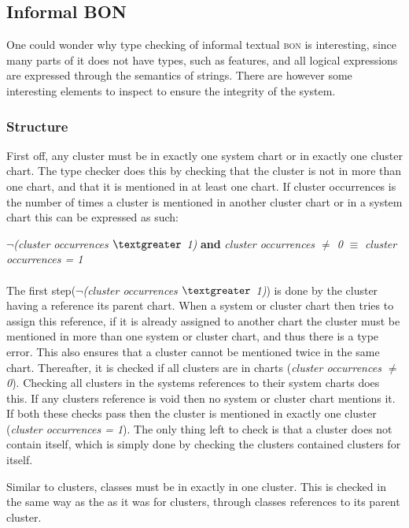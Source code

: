 \subsection{Informal BON}
One could wonder why type checking of informal textual \textsc{bon} is interesting, since many parts of it does not have types, such as features, and all logical expressions are expressed through the semantics of strings. There are however some interesting elements to inspect to ensure the integrity of the system.

\subsubsection{Structure}
First off, any cluster must be in exactly one system chart or in exactly one cluster chart. The type checker does this by checking that the cluster is not in more than one chart, and that it is mentioned in at least one chart. If cluster occurrences is the number of times a cluster is mentioned in another cluster chart or in a system chart this can be expressed as such:
{\footnotesize\begin{center} $\neg$\textit{(cluster occurrences $\textgreater$ 1)} \textbf{and}   \textit{cluster occurrences $\neq$ 0} \textit{} $\equiv$  \textit{cluster occurrences = 1}
\end{center}}
\paragraph{}
The first step({\footnotesize$\neg$\textit{(cluster occurrences $\textgreater$ 1)}}) is done by the cluster having a reference its parent chart. When a system or cluster chart then tries to assign this reference, if it is already assigned to another chart the cluster must be mentioned in more than one system or cluster chart, and thus there is a type error. This also ensures that a cluster cannot be mentioned twice in the same chart. Thereafter, it is checked if all clusters are in charts ({\footnotesize\textit{cluster occurrences $\neq$ 0}}). Checking all clusters in the systems references to their system charts does this. If any clusters reference is void then no system or cluster chart mentions it. If both these checks pass then the cluster is mentioned in exactly one cluster ({\footnotesize\textit{cluster occurrences = 1}}). The only thing left to check is that a cluster does not contain itself, which is simply done by checking the clusters contained clusters for itself. 

Similar to clusters, classes must be in exactly in one cluster. This is checked in the same way as the as it was for clusters, through classes references to its parent cluster.


